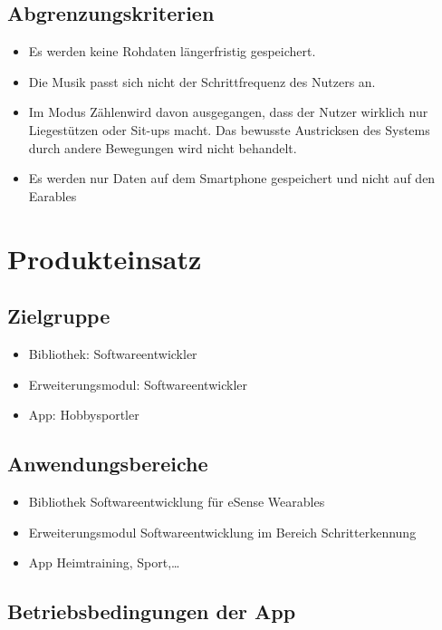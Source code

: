 \documentclass[a4paper,12pt]{article}
\begin{document}
  \subsection{Abgrenzungskriterien}
  \begin{itemize}
    \item\text Es werden keine Rohdaten längerfristig gespeichert.
    \item\text Die Musik passt sich nicht der Schrittfrequenz des Nutzers an.
    \item\text Im Modus \glqq Zählen\grqq{}wird davon ausgegangen, dass der Nutzer wirklich nur Liegestützen oder Sit-ups macht. Das bewusste Austricksen des Systems durch andere Bewegungen wird nicht behandelt.
    \item\text Es werden nur Daten auf dem Smartphone gespeichert und nicht auf den \Gls{Earables}
  \end{itemize}

\section{Produkteinsatz}
  \subsection{Zielgruppe}
  \begin{itemize}
    \item\textsf{Bibliothek:} Softwareentwickler
    \item\textsf{Erweiterungsmodul:} Softwareentwickler
    \item\textsf{App:} Hobbysportler
  \end{itemize}
  \subsection{Anwendungsbereiche}
    \begin{itemize}
      \item\textsf{Bibliothek} Softwareentwicklung für eSense Wearables
      \item\textsf{Erweiterungsmodul} Softwareentwicklung im Bereich Schritterkennung 
      \item\textsf{App} Heimtraining, Sport,\dots
    \end{itemize}
  \subsection{Betriebsbedingungen der App}
    
\end{document}

